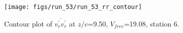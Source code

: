 \begin{figure}[H]
\centering
\texttt{[image: figs/run\_53/run\_53\_rr\_contour]}
\caption{Contour plot of $\overline{v_{r}^{\prime} v_{r}^{\prime}}$ at $z/c$=9.50, $V_{free}$=19.08, station 6.}
\label{fig:run_53_rr_contour}
\end{figure}


